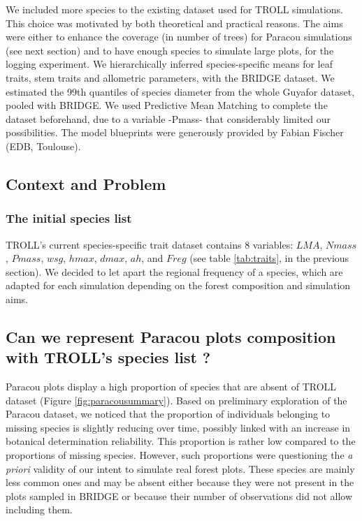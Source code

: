 \documentclass[12pt,]{article}
\theoremstyle{definition}
\theoremstyle{definition}
\theoremstyle{definition}
\theoremstyle{remark}
\begin{document}
We included more species to the existing dataset used for TROLL
simulations. This choice was motivated by both theoretical and practical
reasons. The aims were either to enhance the coverage (in number of
trees) for Paracou simulations (see next section) and to have enough
species to simulate large plots, for the logging experiment. We
hierarchically inferred species-specific means for leaf traits, stem
traits and allometric parameters, with the BRIDGE dataset. We estimated
the 99th quantiles of species diameter from the whole Guyafor dataset,
pooled with BRIDGE. We used Predictive Mean Matching to complete the
dataset beforehand, due to a variable -Pmass- that considerably limited
our possibilities. The model blueprints were generously provided by
Fabian Fischer (EDB, Toulouse).

\subsection{Context and Problem}\label{context-and-problem}

\subsubsection{The initial species list}\label{the-initial-species-list}

TROLL's current species-specific trait dataset contains 8 variables:
\(LMA\), \(Nmass\), \(Pmass\), \(wsg\), \(hmax\), \(dmax\), \(ah\), and
\(Freg\) (see table \ref{tab:traits}, in the previous section). We
decided to let apart the regional frequency of a species, which are
adapted for each simulation depending on the forest composition and
simulation aims.

\subsection{Can we represent Paracou plots composition with TROLL's
species list
?}\label{can-we-represent-paracou-plots-composition-with-trolls-species-list}

Paracou plots display a high proportion of species that are absent of
TROLL dataset (Figure \ref{fig:paracousummary}). Based on preliminary
exploration of the Paracou dataset, we noticed that the proportion of
individuals belonging to missing species is slightly reducing over time,
possibly linked with an increase in botanical determination reliability.
This proportion is rather low compared to the proportions of missing
species. However, such proportions were questioning the \emph{a priori}
validity of our intent to simulate real forest plots. These species are
mainly less common ones and may be absent either because they were not
present in the plots sampled in BRIDGE or because their number of
observations did not allow including them.
\end{document}
